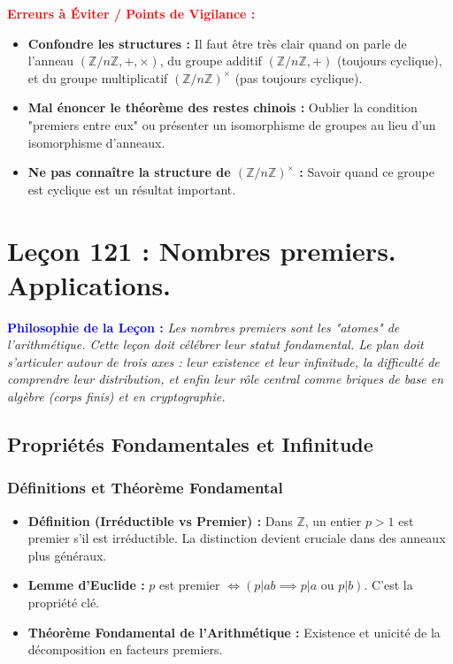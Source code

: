 \documentclass[12pt, a4paper, parskip=full]{report}
\theoremstyle{agregstyle}
\newenvironment{philosophie}
  {\par\medskip\noindent\begin{oframed}\noindent\textbf{\textcolor{blue}{Philosophie de la Leçon :}}\itshape}
  {\end{oframed}\par\medskip}
\newenvironment{erreurs}
  {\par\medskip\noindent\begin{oframed}\noindent\textbf{\textcolor{red}{Erreurs à Éviter / Points de Vigilance :}}}
  {\end{oframed}\par\medskip}
\begin{document}
\begin{erreurs}
    \begin{itemize}
        \item \textbf{Confondre les structures :} Il faut être très clair quand on parle de l'anneau $(\mathbb{Z}/n\mathbb{Z}, +, \times)$, du groupe additif $(\mathbb{Z}/n\mathbb{Z}, +)$ (toujours cyclique), et du groupe multiplicatif $(\mathbb{Z}/n\mathbb{Z})^\times$ (pas toujours cyclique).
        \item \textbf{Mal énoncer le théorème des restes chinois :} Oublier la condition "premiers entre eux" ou présenter un isomorphisme de groupes au lieu d'un isomorphisme d'anneaux.
        \item \textbf{Ne pas connaître la structure de $(\mathbb{Z}/n\mathbb{Z})^\times$ :} Savoir quand ce groupe est cyclique est un résultat important.
    \end{itemize}
\end{erreurs}

\newpage
\chapter{Leçon 121 : Nombres premiers. Applications.}

\begin{philosophie}
    Les nombres premiers sont les "atomes" de l'arithmétique. Cette leçon doit célébrer leur statut fondamental. Le plan doit s'articuler autour de trois axes : leur existence et leur infinitude, la difficulté de comprendre leur distribution, et enfin leur rôle central comme briques de base en algèbre (corps finis) et en cryptographie.
\end{philosophie}

\section{Propriétés Fondamentales et Infinitude}

\subsection{Définitions et Théorème Fondamental}
\begin{itemize}
    \item \textbf{Définition (Irréductible vs Premier) :} Dans $\mathbb{Z}$, un entier $p>1$ est premier s'il est irréductible. La distinction devient cruciale dans des anneaux plus généraux.
    \item \textbf{Lemme d'Euclide :} $p$ est premier $\iff (p|ab \implies p|a \text{ ou } p|b)$. C'est la propriété clé.
    \item \textbf{Théorème Fondamental de l'Arithmétique :} Existence et unicité de la décomposition en facteurs premiers.
\end{itemize}
\end{document}
